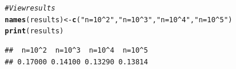 \documentclass[12pt]{article}\usepackage[]{graphicx}\usepackage[]{xcolor}
\makeatletter
\newcommand{\hlsng}[1]{\textcolor[rgb]{0.192,0.494,0.8}{#1}}%
\newcommand{\hlcom}[1]{\textcolor[rgb]{0.678,0.584,0.686}{\textit{#1}}}%
\newcommand{\hldef}[1]{\textcolor[rgb]{0.345,0.345,0.345}{#1}}%
\newcommand{\hlkwb}[1]{\textcolor[rgb]{0.69,0.353,0.396}{#1}}%
\newcommand{\hlkwd}[1]{\textcolor[rgb]{0.737,0.353,0.396}{\textbf{#1}}}%
\newenvironment{kframe}{%
 \def\at@end@of@kframe{}%
 \ifinner\ifhmode%
  \def\at@end@of@kframe{\end{minipage}}%
  \begin{minipage}{\columnwidth}%
 \fi\fi%
 \def\FrameCommand##1{\hskip\@totalleftmargin \hskip-\fboxsep
 \colorbox{shadecolor}{##1}\hskip-\fboxsep
     \hskip-\linewidth \hskip-\@totalleftmargin \hskip\columnwidth}%
 \MakeFramed {\advance\hsize-\width
   \@totalleftmargin\z@ \linewidth\hsize
   \@setminipage}}%
 {\par\unskip\endMakeFramed%
 \at@end@of@kframe}
\newenvironment{knitrout}{}{} %
\makeatother
\begin{document}
\begin{knitrout}
\begin{kframe}
\begin{alltt}
\hlcom{# View results}
\hlkwd{names}\hldef{(results)} \hlkwb{<-} \hlkwd{c}\hldef{(}\hlsng{"n=10^2"}\hldef{,} \hlsng{"n=10^3"}\hldef{,} \hlsng{"n=10^4"}\hldef{,} \hlsng{"n=10^5"}\hldef{)}
\hlkwd{print}\hldef{(results)}
\end{alltt}
\begin{verbatim}
##  n=10^2  n=10^3  n=10^4  n=10^5 
## 0.17000 0.14100 0.13290 0.13814
\end{verbatim}
\end{kframe}
\end{knitrout}




\printbibliography
\end{document}
